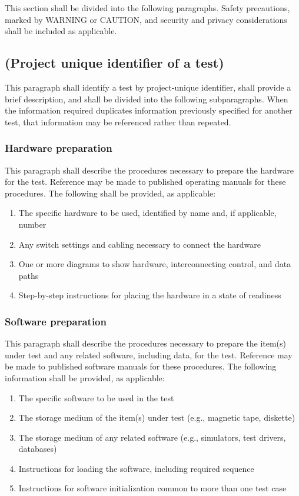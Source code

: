 \documentclass{fidata-report-template}
\begin{document}
This section shall be divided into the following paragraphs. Safety
precautions, marked by WARNING or CAUTION, and security and privacy
considerations shall be included as applicable.

\subsection{(Project unique identifier of a test)}

This paragraph shall identify a test by project-unique identifier, shall
provide a brief description, and shall be divided into the following
subparagraphs. When the information required duplicates information
previously specified for another test, that information may be
referenced rather than repeated.

\subsubsection{Hardware preparation}

This paragraph shall describe the procedures necessary to prepare the
hardware for the test. Reference may be made to published operating
manuals for these procedures. The following shall be provided, as
applicable:

\begin{enumerate}
\itemsep1pt\parskip0pt
\item
  The specific hardware to be used, identified by name and, if
  applicable, number
\item
  Any switch settings and cabling necessary to connect the hardware
\item
  One or more diagrams to show hardware, interconnecting control, and
  data paths
\item
  Step-by-step instructions for placing the hardware in a state of
  readiness
\end{enumerate}

\subsubsection{Software preparation}

This paragraph shall describe the procedures necessary to prepare the
item(s) under test and any related software, including data, for the
test. Reference may be made to published software manuals for these
procedures. The following information shall be provided, as applicable:

\begin{enumerate}
\itemsep1pt\parskip0pt
\item
  The specific software to be used in the test
\item
  The storage medium of the item(s) under test (e.g., magnetic tape,
  diskette)
\item
  The storage medium of any related software (e.g., simulators, test
  drivers, databases)
\item
  Instructions for loading the software, including required sequence
\item
  Instructions for software initialization common to more than one test
  case
\end{enumerate}
\end{document}
